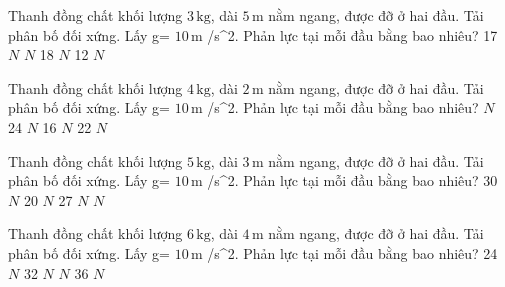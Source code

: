 \begin{ex}
Thanh đồng chất khối lượng $3\,\text{kg}$, dài $5\,\text{m}$ nằm ngang, được đỡ ở hai đầu. Tải phân bố đối xứng. Lấy g= $10\,\text{m}$ /s^2. Phản lực tại mỗi đầu bằng bao nhiêu?
\choice
{17 $N$}
{ $N$}
{18 $N$}
{12 $N$}
\end{ex}

\begin{ex}
Thanh đồng chất khối lượng $4\,\text{kg}$, dài $2\,\text{m}$ nằm ngang, được đỡ ở hai đầu. Tải phân bố đối xứng. Lấy g= $10\,\text{m}$ /s^2. Phản lực tại mỗi đầu bằng bao nhiêu?
\choice
{ $N$}
{24 $N$}
{16 $N$}
{22 $N$}
\end{ex}

\begin{ex}
Thanh đồng chất khối lượng $5\,\text{kg}$, dài $3\,\text{m}$ nằm ngang, được đỡ ở hai đầu. Tải phân bố đối xứng. Lấy g= $10\,\text{m}$ /s^2. Phản lực tại mỗi đầu bằng bao nhiêu?
\choice
{30 $N$}
{20 $N$}
{27 $N$}
{ $N$}
\end{ex}

\begin{ex}
Thanh đồng chất khối lượng $6\,\text{kg}$, dài $4\,\text{m}$ nằm ngang, được đỡ ở hai đầu. Tải phân bố đối xứng. Lấy g= $10\,\text{m}$ /s^2. Phản lực tại mỗi đầu bằng bao nhiêu?
\choice
{24 $N$}
{32 $N$}
{ $N$}
{36 $N$}
\end{ex}

